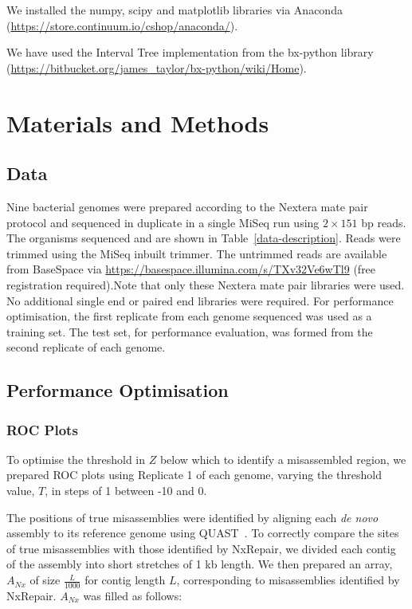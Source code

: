 \documentclass[fleqn,10pt]{wlpeerj}
\begin{document}
We installed the numpy, scipy and matplotlib libraries via Anaconda (\url{https://store.continuum.io/cshop/anaconda/}).

We have used the Interval Tree implementation from the bx-python library (\url{https://bitbucket.org/james_taylor/bx-python/wiki/Home}).   

\section*{Materials and Methods}
\subsection*{Data}
Nine bacterial genomes were prepared according to the Nextera mate pair protocol and sequenced in duplicate in a single MiSeq run using $2 \times 151$ bp reads. The organisms sequenced and  are shown in Table~\ref{data-description}. Reads were trimmed using the MiSeq inbuilt trimmer. The untrimmed reads are available from BaseSpace via \url{https://basespace.illumina.com/s/TXv32Ve6wTl9} (free registration required).Note that only these Nextera mate pair libraries were used. No additional single end or paired end libraries were required. For performance optimisation, the first replicate from each genome sequenced was used as a training set. The test set, for performance evaluation, was formed from the second replicate of each genome. 

\subsection*{Performance Optimisation}
\subsubsection*{ROC Plots}
To optimise the threshold in $Z$ below which to identify a misassembled region, we prepared ROC plots using Replicate 1 of each genome, varying the threshold value, $T$, in steps of 1 between -10 and 0. 

The positions of true misassemblies were identified by aligning each \textit{de novo} assembly to its reference genome using QUAST~\citep{gurevich2013}. To correctly compare the sites of true misassemblies with those identified by NxRepair, we divided each contig of the assembly into short stretches of 1 kb length. We then prepared an array, $A_{Nx}$ of size $\frac{L}{1000}$ for contig length $L$, corresponding to misassemblies identified by NxRepair. $A_{Nx}$ was filled as follows:
\end{document}
